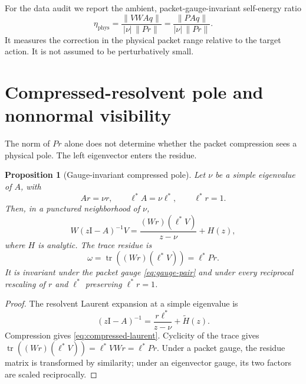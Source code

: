 \documentclass[11pt]{article}
\newtheorem{proposition}[theorem]{Proposition}
\theoremstyle{definition}
\theoremstyle{remark}
\newcommand{\Id}{\mathrm I}
\newcommand{\tr}{\operatorname{tr}}
\begin{document}
For the data audit we report the ambient, packet-gauge-invariant
self-energy ratio
\begin{equation}
\label{eq:physical-self-energy-ratio}
 \eta_{\mathrm{phys}}
 =\frac{\|VWAq\|}{{|\nu|\,\|Pr\|}}
 =\frac{\|PAq\|}{{|\nu|\,\|Pr\|}}.
\end{equation}
It measures the correction in the physical packet range relative to the
target action.  It is not assumed to be perturbatively small.

\section{Compressed-resolvent pole and nonnormal visibility}
\label{sec:residue}

The norm of $Pr$ alone does not determine whether the packet compression
sees a physical pole.  The left eigenvector enters the residue.

\begin{proposition}[Gauge-invariant compressed pole]
\label{prop:compressed-pole}
Let $\nu$ be a simple eigenvalue of $A$, with
\begin{equation}
\label{eq:left-right-normalization}
 Ar=\nu r,
 \qquad
 \ell^*A=\nu\ell^*,
 \qquad
 \ell^*r=1.
\end{equation}
Then, in a punctured neighborhood of $\nu$,
\begin{equation}
\label{eq:compressed-laurent}
 W(z\Id-A)^{-1}V
 =\frac{(Wr)(\ell^*V)}{z-\nu}+H(z),
\end{equation}
where $H$ is analytic.  The trace residue is
\begin{equation}
\label{eq:spectral-packet-weight}
 \boxed{
 \omega=\tr\!\left((Wr)(\ell^*V)\right)=\ell^*Pr}.
\end{equation}
It is invariant under the packet gauge \eqref{eq:gauge-pair} and under every
reciprocal rescaling of $r$ and $\ell^*$ preserving $\ell^*r=1$.
\end{proposition}

\begin{proof}
The resolvent Laurent expansion at a simple eigenvalue is
\begin{equation}
\label{eq:resolvent-laurent}
 (z\Id-A)^{-1}=\frac{r\ell^*}{z-\nu}+\widetilde H(z).
\end{equation}
Compression gives \eqref{eq:compressed-laurent}.  Cyclicity of the trace
gives
$\tr((Wr)(\ell^*V))=\ell^*VWr=\ell^*Pr$.  Under a packet gauge, the residue
matrix is transformed by similarity; under an eigenvector gauge, its two
factors are scaled reciprocally.
\end{proof}
\end{document}
